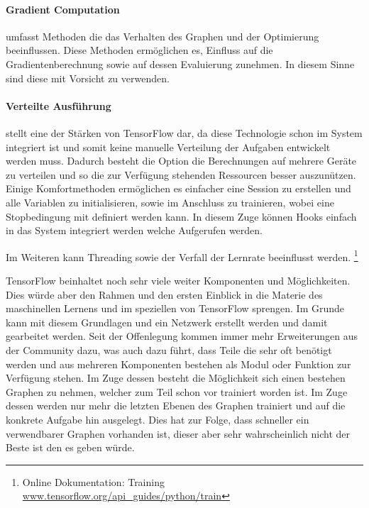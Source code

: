\paragraph{Gradient Computation} umfasst Methoden die das Verhalten des Graphen und der Optimierung beeinflussen. 
Diese Methoden ermöglichen es, Einfluss auf die Gradientenberechnung sowie auf dessen Evaluierung zunehmen. 
In diesem Sinne sind diese mit Vorsicht zu verwenden.

\paragraph{Verteilte Ausführung} stellt eine der Stärken von TensorFlow dar, da diese Technologie schon im System integriert ist und somit keine manuelle Verteilung der Aufgaben entwickelt werden muss.
Dadurch besteht die Option die Berechnungen auf mehrere Geräte zu verteilen und so die zur Verfügung stehenden Ressourcen besser auszunützen. \\

\noindent
Einige Komfortmethoden ermöglichen es einfacher eine Session zu erstellen und alle Variablen zu initialisieren, sowie im Anschluss zu trainieren, wobei eine Stopbedingung mit definiert werden kann.
In diesem Zuge können Hooks einfach in das System integriert werden welche Aufgerufen werden.

\noindent
Im Weiteren kann Threading sowie der Verfall der Lernrate beeinflusst werden. \footnote{Online Dokumentation: Training \url{www.tensorflow.org/api_guides/python/train}}
\phantom \newline



\noindent
TensorFlow beinhaltet noch sehr viele weiter Komponenten und Möglichkeiten. 
Dies würde aber den Rahmen und den ersten Einblick in die Materie des maschinellen Lernens und im speziellen von TensorFlow sprengen. 
Im Grunde kann mit diesem Grundlagen und ein Netzwerk erstellt werden und damit gearbeitet werden. 
Seit der Offenlegung kommen immer mehr Erweiterungen aus der Community dazu, was auch dazu führt, dass Teile die sehr oft benötigt werden und aus mehreren Komponenten bestehen als Modul oder Funktion zur Verfügung stehen. 
Im Zuge dessen besteht die Möglichkeit sich einen bestehen Graphen zu nehmen, welcher zum Teil schon vor trainiert worden ist. 
Im Zuge dessen werden nur mehr die letzten Ebenen des Graphen trainiert und auf die konkrete Aufgabe hin ausgelegt. 
Dies hat zur Folge, dass schneller ein verwendbarer Graphen vorhanden ist, dieser aber sehr wahrscheinlich nicht der Beste ist den es geben würde. 


